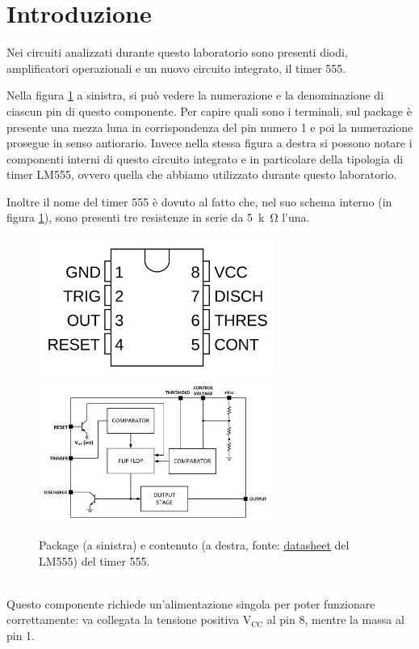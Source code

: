 \documentclass{report}
\begin{document}
\section*{Introduzione}
Nei circuiti analizzati durante questo laboratorio sono presenti diodi, amplificatori operazionali e un nuovo circuito integrato, il timer 555.\par
Nella figura \ref{figura:timer1} a sinistra, si può vedere la numerazione e la denominazione di ciascun pin di questo componente. Per capire quali sono i terminali, sul package è presente una mezza luna in corrispondenza del pin numero 1 e poi la numerazione prosegue in senso antiorario. Invece nella stessa figura a destra si possono notare i componenti interni di questo circuito integrato e in particolare della tipologia di timer LM555, ovvero quella che abbiamo utilizzato durante questo laboratorio.\par
Inoltre il nome del timer 555 è dovuto al fatto che, nel suo schema interno (in figura \ref{figura:timer1}), sono presenti tre resistenze in serie da \SI{5}{k\ohm} l'una.
\begin{figure}[h!]
	\centering
	\includegraphics[height=4.6cm]{immagini/timer1}
	\includegraphics[height=4.6cm]{immagini/timer2}
	\caption{Package (a sinistra) e contenuto (a destra, fonte: \textcolor{blue}{\underline{\href{https://www.ti.com/lit/ds/symlink/lm555.pdf?ts=1667144089940&ref_url=https\%253A\%252F\%252Fwww.ti.com\%252Fproduct\%252FLM555}{datasheet}}} del LM555) del timer 555.}
	\label{figura:timer1}
\end{figure}
\\Questo componente richiede un'alimentazione singola per poter funzionare correttamente: va collegata la tensione positiva $\mathrm{V_{CC}}$ al pin 8, mentre la massa al pin 1.\par
\end{document}
